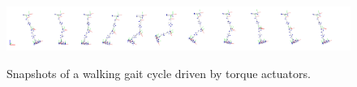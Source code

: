 \begin{figure}[t!]
\centering
\includegraphics[width=\textwidth]{figures/multiphase_walking_cycle.png}\\
\caption{Snapshots of a walking gait cycle driven by torque actuators.}
\label{fig:snapshots_multiphase_walking_cycle}
\end{figure}

